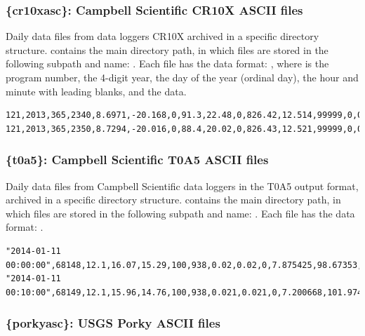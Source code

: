 \subsubsection{\{cr10xasc\}: Campbell Scientific CR10X ASCII files}

Daily data files from data loggers CR10X archived in a specific directory structure.  contains the main directory path, in which files are stored in the following subpath and name: . Each file has the data format: , where  is the program number,  the 4-digit year,  the day of the year (ordinal day),  the hour and minute with leading blanks, and the data.

\begin{lstlisting}[language={},title=Campbell CR10X format example]
121,2013,365,2340,8.6971,-20.168,0,91.3,22.48,0,826.42,12.514,99999,0,0
121,2013,365,2350,8.7294,-20.016,0,88.4,20.02,0,826.43,12.521,99999,0,0
\end{lstlisting}


\subsubsection{\{t0a5\}: Campbell Scientific T0A5 ASCII files}

Daily data files from Campbell Scientific data loggers in the T0A5 output format, archived in a specific directory structure.  contains the main directory path, in which files are stored in the following subpath and name: . Each file has the data format: .

\begin{lstlisting}[language={},title=Campbell T0A5 format example]
"2014-01-11 00:00:00",68148,12.1,16.07,15.29,100,938,0.02,0.02,0,7.875425,98.67353,10.86884,0,0,0,0,0,0,0,0
"2014-01-11 00:10:00",68149,12.1,15.96,14.76,100,938,0.021,0.021,0,7.200668,101.9742,11.35311,0,0,0,0,0,0,0,0
\end{lstlisting}


\subsubsection{\{porkyasc\}: USGS Porky ASCII files}

